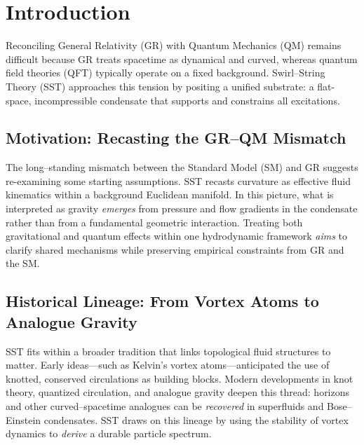 \documentclass[10pt,reprint,aps,onecolumn,nofootinbib]{revtex4-2}
\begin{document}
\section{Introduction}
    \label{sec:intro}
    Reconciling General Relativity (GR) with Quantum Mechanics (QM) remains difficult because GR treats spacetime as dynamical and curved, whereas quantum field theories (QFT) typically operate on a fixed background. Swirl–String Theory (SST) approaches this tension by positing a unified substrate: a flat-space, incompressible condensate that supports and constrains all excitations.

    \subsection*{Motivation: Recasting the GR–QM Mismatch}
        The long–standing mismatch between the Standard Model (SM) and GR suggests re-examining some starting assumptions. SST recasts curvature as effective fluid kinematics within a background Euclidean manifold. In this picture, what is interpreted as gravity \emph{emerges} from pressure and flow gradients in the condensate rather than from a fundamental geometric interaction. Treating both gravitational and quantum effects within one hydrodynamic framework \emph{aims} to clarify shared mechanisms while preserving empirical constraints from GR and the SM.

    \subsection*{Historical Lineage: From Vortex Atoms to Analogue Gravity}
        SST fits within a broader tradition that links topological fluid structures to matter. Early ideas—such as Kelvin’s vortex atoms—anticipated the use of knotted, conserved circulations as building blocks. Modern developments in knot theory, quantized circulation, and analogue gravity deepen this thread: horizons and other curved–spacetime analogues can be \emph{recovered} in superfluids and Bose–Einstein condensates. SST draws on this lineage by using the stability of vortex dynamics to \emph{derive} a durable particle spectrum.
\end{document}
